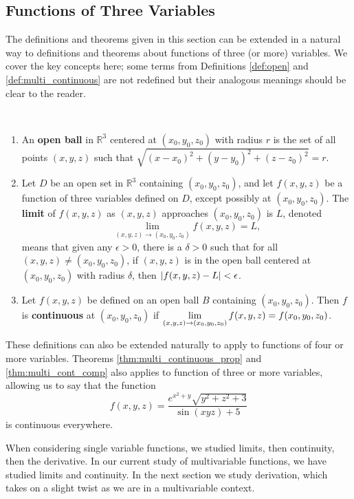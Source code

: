 \subsection{Functions of Three Variables}

The definitions and theorems given in this section can be extended in a natural way to definitions and theorems about functions of three (or more) variables. We cover the key concepts here; some terms from Definitions \ref{def:open} and \ref{def:multi_continuous} are not redefined but their analogous meanings should be clear to the reader.

{%
\begin{definition}\label{def:multi3defs}%
%
\mbox{}\\[-1.5\baselineskip]\parbox[t]{\linewidth}{%
\begin{enumerate}
\item An \textbf{open ball} in $\mathbb{R}^3$ centered at $(x_0,y_0,z_0)$ with radius $r$ is the set of all points $(x,y,z)$ such that $\sqrt{(x-x_0)^2+(y-y_0)^2+(z-z_0)^2} = r$.\bigskip
\item Let $D$ be an open set in $\mathbb{R}^3$ containing $(x_0,y_0,z_0)$, and let $f(x,y,z)$ be a function of three variables defined on $D$, except possibly at  $(x_0,y_0,z_0)$. The \textbf{limit} of $f(x,y,z)$ as $(x,y,z)$ approaches $(x_0,y_0,z_0)$ is $L$, denoted 
\[\lim_{(x,y,z)\to (x_0,y_0,z_0)} f(x,y,z) = L,\]
means that given any $\epsilon >0$, there is a $\delta >0$ such that for all  $(x,y,z)\neq(x_0,y_0,z_0)$, if $(x,y,z)$ is in the open ball centered at $(x_0,y_0,z_0)$ with radius $\delta$, then $\left\lvert f(x,y,z) - L \right\rvert< \epsilon$.\bigskip
\item Let $f(x,y,z)$ be defined on an open ball $B$ containing $(x_0,y_0,z_0)$. Then $f$ is \textbf{continuous} at $(x_0,y_0,z_0)$ if $\displaystyle \lim_{(x,y,z)\to (x_0,y_0,z_0)} f(x,y,z) = f(x_0,y_0,z_0)$.
\end{enumerate}}
\end{definition}}

These definitions can also be extended naturally to apply to functions of four or more variables. Theorems \ref{thm:multi_continuous_prop} and \ref{thm:multi_cont_comp} also applies to function of three or more variables, allowing us to say that the function
\[f(x,y,z) = \frac{e^{x^2+y}\sqrt{y^2+z^2+3}}{\sin (xyz)+5}\]
is continuous everywhere.

When considering single variable functions, we studied limits, then continuity, then the derivative. In our current study of multivariable functions, we have studied limits and continuity. In the next section we study derivation, which takes on a slight twist as we are in a multivariable context.


